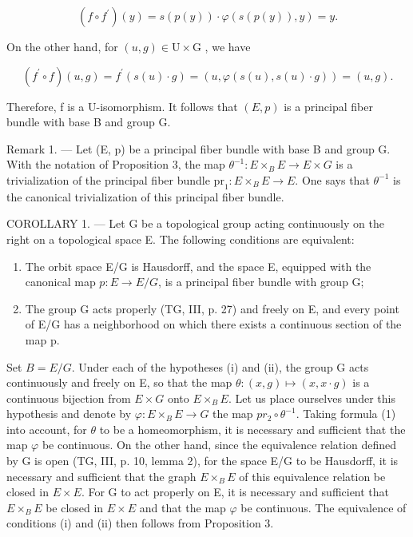\[
(f \circ f ^ {\prime}) (y) = s (p (y)) \cdot \varphi (s (p (y)), y) = y.
\]

On the other hand, for \((u,g)\in \mathrm{U}\times \mathrm{G}\) , we have

\[
(f ^ {\prime} \circ f) (u, g) = f ^ {\prime} (s (u) \cdot g) = (u, \varphi (s (u), s (u) \cdot g)) = (u, g).
\]

Therefore, f is a U-isomorphism. It follows that \((E,p)\) is a principal fiber bundle with base B and group G.

Remark 1. --- Let (E, p) be a principal fiber bundle with base B and group G. With the notation of Proposition 3, the map \(\theta^{-1}\colon E \times_{B} E \to E \times G\) is a trivialization of the principal fiber bundle \(\mathrm{pr}_{1}\colon E \times_{B} E \to E\). One says that \(\theta^{-1}\) is the canonical trivialization of this principal fiber bundle.

COROLLARY 1. --- Let G be a topological group acting continuously on the right on a topological space E. The following conditions are equivalent:

\begin{enumerate}
\def\labelenumi{(\roman{enumi})}
\item
  The orbit space E/G is Hausdorff, and the space E, equipped with the canonical map \(p: E \rightarrow E/G\), is a principal fiber bundle with group G;
\item
  The group G acts properly (TG, III, p. 27) and freely on E, and every point of E/G has a neighborhood on which there exists a continuous section of the map p.
\end{enumerate}

Set \(B=E/G\). Under each of the hypotheses (i) and (ii), the group G acts continuously and freely on E, so that the map \(\theta\colon(x,g)\mapsto(x,x\cdot g)\) is a continuous bijection from \(E\times G\) onto \(E\times_{B}E\). Let us place ourselves under this hypothesis and denote by \(\varphi\colon E\times_{B}E\to G\) the map \(pr_{2}\circ\theta^{-1}\). Taking formula (1) into account, for \(\theta\) to be a homeomorphism, it is necessary and sufficient that the map \(\varphi\) be continuous. On the other hand, since the equivalence relation defined by G is open (TG, III, p. 10, lemma 2), for the space E/G to be Hausdorff, it is necessary and sufficient that the graph \(E\times_{B}E\) of this equivalence relation be closed in \(E\times E\). For G to act properly on E, it is necessary and sufficient that \(E\times_{B}E\) be closed in \(E\times E\) and that the map \(\varphi\) be continuous. The equivalence of conditions (i) and (ii) then follows from Proposition 3.

